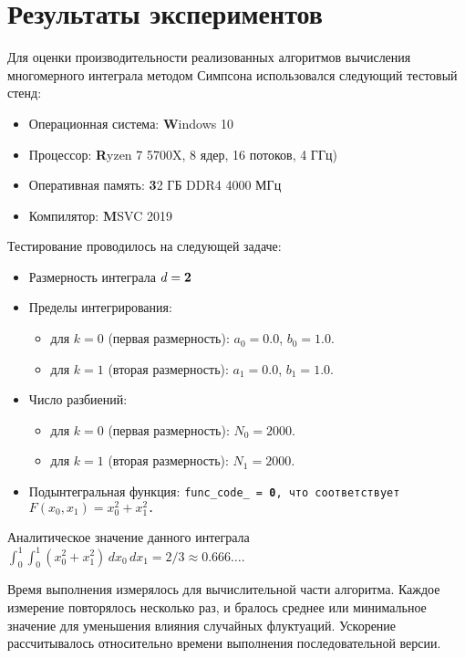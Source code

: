 \documentclass[a4paper,12pt]{article}
\begin{document}
\newpage
\section{Результаты экспериментов}
\label{sec:results}
Для оценки производительности реализованных алгоритмов вычисления многомерного интеграла методом Симпсона использовался следующий тестовый стенд:
\begin{itemize}
    \item Операционная система: \textbf Windows 10
    \item Процессор: \textbf Ryzen 7 5700X, 8 ядер, 16 потоков, 4 ГГц)
    \item Оперативная память: \textbf 32 ГБ DDR4 4000 МГц
    \item Компилятор: \textbf MSVC 2019
\end{itemize}

Тестирование проводилось на следующей задаче:
\begin{itemize}
    \item Размерность интеграла $d = \textbf 2$
    \item Пределы интегрирования: 
        \begin{itemize}
            \item для $k=0$ (первая размерность): $a_0 = 0.0$, $b_0 = 1.0$.
            \item для $k=1$ (вторая размерность): $a_1 = 0.0$, $b_1 = 1.0$.
        \end{itemize}
    \item Число разбиений: 
        \begin{itemize}
            \item для $k=0$ (первая размерность): $N_0 = 2000$.
            \item для $k=1$ (вторая размерность): $N_1 = 2000$.
        \end{itemize}
    \item Подынтегральная функция: \texttt{func\_code\_ = \textbf 0, что соответствует $F(x_0, x_1) = x_0^2 + x_1^2$.}
\end{itemize}
Аналитическое значение данного интеграла $\int_{0}^{1} \int_{0}^{1} (x_0^2 + x_1^2) \,dx_0 \,dx_1 = 2/3 \approx 0.666\dots$.

Время выполнения измерялось для вычислительной части алгоритма. Каждое измерение повторялось несколько раз, и бралось среднее или минимальное значение для уменьшения влияния случайных флуктуаций. Ускорение рассчитывалось относительно времени выполнения последовательной версии.
\end{document}
